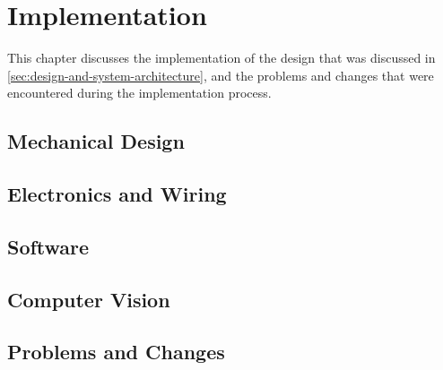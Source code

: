 \section{Implementation}
\label{sec:implementation}

This chapter discusses the implementation of the design that was discussed in \autoref{sec:design-and-system-architecture}, and the problems and changes that were encountered during the implementation process.

\subsection{Mechanical Design}
\label{sec:implementation-mechanical-design}


\subsection{Electronics and Wiring}
\label{sec:electronics}


\subsection{Software}
\label{sec:software}


\subsection{Computer Vision}
\label{sec:computer-vision}
  

\subsection{Problems and Changes}
\label{sec:implementation-problems-and-changes}